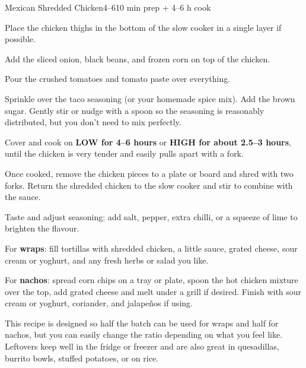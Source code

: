 \begin{recipebox}{Mexican Shredded Chicken}{4--6}{10 min prep + 4--6 h cook}
  \begin{method}
    \item Place the chicken thighs in the bottom of the slow cooker in a single layer if possible.
    \item Add the sliced onion, black beans, and frozen corn on top of the chicken.
    \item Pour the crushed tomatoes and tomato paste over everything.
    \item Sprinkle over the taco seasoning (or your homemade spice mix). Add the brown sugar. Gently stir or nudge with a spoon so the seasoning is reasonably distributed, but you don’t need to mix perfectly.
    \item Cover and cook on \textbf{LOW for 4--6 hours} or \textbf{HIGH for about 2.5--3 hours}, until the chicken is very tender and easily pulls apart with a fork.
    \item Once cooked, remove the chicken pieces to a plate or board and shred with two forks. Return the shredded chicken to the slow cooker and stir to combine with the sauce.
    \item Taste and adjust seasoning: add salt, pepper, extra chilli, or a squeeze of lime to brighten the flavour.
    \item For \textbf{wraps}: fill tortillas with shredded chicken, a little sauce, grated cheese, sour cream or yoghurt, and any fresh herbs or salad you like.
    \item For \textbf{nachos}: spread corn chips on a tray or plate, spoon the hot chicken mixture over the top, add grated cheese and melt under a grill if desired. Finish with sour cream or yoghurt, coriander, and jalapeños if using.
  \end{method}

  \begin{notes}
    This recipe is designed so half the batch can be used for wraps and half for nachos, but you can easily change the ratio depending on what you feel like. Leftovers keep well in the fridge or freezer and are also great in quesadillas, burrito bowls, stuffed potatoes, or on rice.
  \end{notes}
\end{recipebox}
